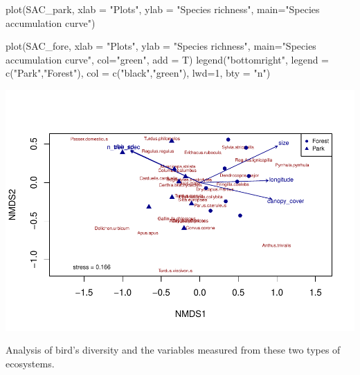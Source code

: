 \documentclass[
]{article}
\newenvironment{Shaded}{\begin{snugshade}}{\end{snugshade}}
\newcommand{\AttributeTok}[1]{\textcolor[rgb]{0.77,0.63,0.00}{#1}}
\newcommand{\DecValTok}[1]{\textcolor[rgb]{0.00,0.00,0.81}{#1}}
\newcommand{\FunctionTok}[1]{\textcolor[rgb]{0.00,0.00,0.00}{#1}}
\newcommand{\NormalTok}[1]{#1}
\newcommand{\StringTok}[1]{\textcolor[rgb]{0.31,0.60,0.02}{#1}}
\begin{document}
\begin{Shaded}
\begin{Highlighting}[]
\FunctionTok{plot}\NormalTok{(SAC\_park, }\AttributeTok{xlab =} \StringTok{"Plots"}\NormalTok{, }\AttributeTok{ylab =} \StringTok{"Species richness"}\NormalTok{, }\AttributeTok{main=}\StringTok{"Species accumulation curve"}\NormalTok{)}

\FunctionTok{plot}\NormalTok{(SAC\_fore, }\AttributeTok{xlab =} \StringTok{"Plots"}\NormalTok{, }\AttributeTok{ylab =} \StringTok{"Species richness"}\NormalTok{, }\AttributeTok{main=}\StringTok{"Species accumulation curve"}\NormalTok{, }\AttributeTok{col=}\StringTok{"green"}\NormalTok{, }\AttributeTok{add =}\NormalTok{ T)}
\FunctionTok{legend}\NormalTok{(}\StringTok{"bottomright"}\NormalTok{, }\AttributeTok{legend =} \FunctionTok{c}\NormalTok{(}\StringTok{"Park"}\NormalTok{,}\StringTok{"Forest"}\NormalTok{), }\AttributeTok{col =} \FunctionTok{c}\NormalTok{(}\StringTok{"black"}\NormalTok{,}\StringTok{"green"}\NormalTok{), }\AttributeTok{lwd=}\DecValTok{1}\NormalTok{, }\AttributeTok{bty =} \StringTok{"n"}\NormalTok{)}
\end{Highlighting}
\end{Shaded}

\includegraphics{birdsdataanalysis_files/figure-latex/unnamed-chunk-13-1.pdf}

Analysis of bird's diversity and the variables measured from these two
types of ecosystems.
\end{document}
